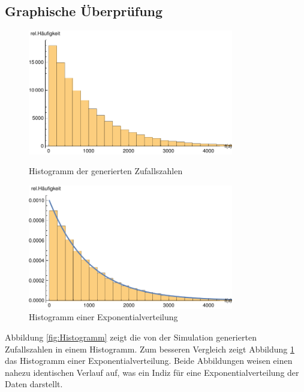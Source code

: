 \subsection{Graphische Überprüfung}
\begin{figure}[!htb]
	\centering
	\begin{minipage}{.5\textwidth}
		\centering
		\includegraphics[width=0.8\textwidth]{abbildungen/distribution/histogramm.pdf}
		\caption{Histogramm der generierten Zufallszahlen}
		\label{fig:Histogramm}
	\end{minipage}%
	\begin{minipage}{0.5\textwidth}
		\centering
		\includegraphics[width=0.8\textwidth]{abbildungen/distribution/histogrammExpVerteilung.pdf}
		\caption{Histogramm einer Exponentialverteilung}
		\label{fig:HistogrammExp}
	\end{minipage}
\end{figure}

Abbildung \ref{fig:Histogramm} zeigt die von der Simulation generierten Zufallszahlen in einem Histogramm. Zum besseren Vergleich zeigt Abbildung \ref{fig:HistogrammExp} das Histogramm einer Exponentialverteilung. Beide Abbildungen weisen einen nahezu identischen Verlauf auf, was ein Indiz für eine Exponentialverteilung der Daten darstellt.


